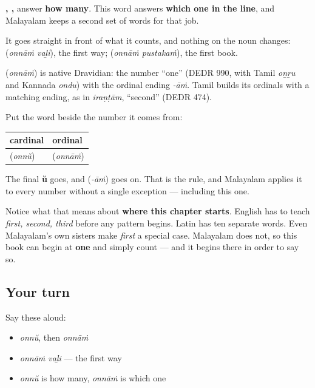 \textbf{, , } answer \textbf{how many}. This word answers \textbf{which one in the line}, and Malayalam keeps a second set of words for that job.

It goes straight in front of what it counts, and nothing on the noun changes: \textbf{ } (\emph{onnāṁ vaḻi}), the first way; \textbf{ } (\emph{onnāṁ pustakaṁ}), the first book.

\begin{cousinweb}
\textbf{} (\emph{onnāṁ}) is native Dravidian: the number \textquotedblleft{}one\textquotedblright{} (DEDR 990, with Tamil \emph{oṉṟu} and Kannada \emph{ondu}) with the ordinal ending \emph{-āṁ}. Tamil builds its ordinals with a matching ending, as in \emph{iraṇṭām}, \textquotedblleft{}second\textquotedblright{} (DEDR 474).
\end{cousinweb}

\begin{grammarlens}[title={Grammar Lens: one ending, and no exceptions to it}]
Put the word beside the number it comes from:

\noindent
\begin{tabularx}{\linewidth}{@{}>{\raggedright\arraybackslash}X>{\raggedright\arraybackslash}X@{}}
\toprule
\textbf{cardinal} & \textbf{ordinal} \\
\midrule
\textbf{\ml{ഒന്ന്}} (\emph{onnŭ}) & \textbf{\ml{ഒന്നാം}} (\emph{onnāṁ}) \\
\bottomrule
\end{tabularx}

The final \textbf{ŭ} goes, and \textbf{} (\emph{-āṁ}) goes on. That is the rule, and Malayalam applies it to every number without a single exception — including this one.

Notice what that means about \textbf{where this chapter starts}. English has to teach \emph{first, second, third} before any pattern begins. Latin has ten separate words. Even Malayalam's own sisters make \emph{first} a special case. Malayalam does not, so this book can begin at \textbf{one} and simply count — and it begins there in order to say so.
\end{grammarlens}

\subsection*{Your turn}
Say these aloud:

\begin{itemize}
\raggedright
  \item \emph{onnŭ}, then \emph{onnāṁ}
  \item \emph{onnāṁ vaḻi} — the first way
  \item \emph{onnŭ} is how many, \emph{onnāṁ} is which one
\end{itemize}


